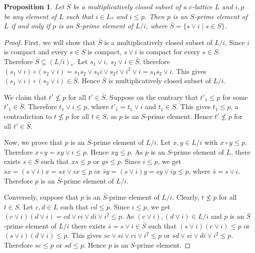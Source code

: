 \documentclass[10pt,twoside,a4paper]{amsart}
\numberwithin{equation}{section}
\theoremstyle{plain}
\newtheorem{prop}[lem]{Proposition}
\theoremstyle{definition}
\begin{document}
		
	\begin{prop}%
	Let $S$ be a multiplicatively closed subset of a $c$-lattice $L$ and $i, p $ be any element of $L$ such that  $i \in L_*$ and $i \leq p$. Then $p$ is an $S$-prime element of $L$ if and only if $p$ is an $\bar{S}$-prime element of $L/i$, where $\bar{S} = \{s \vee i \;|\; s\in S\}$.
	\end{prop}
	\begin{proof}  First, we will show that $\bar{S}$ is a multiplicatively closed subset of $L/i$. Since $i$ is compact and every $s \in S$ is compact, $s \vee i$ is compact for every $s \in S$. Therefore $\bar{S} \subseteq  (L/i)_*$. Let $s_1 \vee i, ~ s_2 \vee i \in \bar{S} $. therefore $(s_1 \vee i) \circ (s_2 \vee i) = s_1 s_2 \vee s_1 i \vee s_2 i \vee i^2 \vee i = s_1 s_2 \vee  i $. This gives $(s_1 \vee i) \circ (s_2 \vee i) \in \bar{S}$. Hence $\bar{S}$ is multiplicatively closed subset of $L/i$. 
			
	We claim that $t' \nleq p$ for all $t' \in \bar{S}$. Suppose on the contrary that $t'_1 \leq p$ for some $t'_1 \in \bar{S}$. Therefore $t_1 \vee i \leq p$, where $t'_1 = t_1 \vee i$ and $t_1 \in S$. This gives $t_1 \leq p$,  a contradiction to  $t \not\leq p$ for all $t \in S$, as $p$ is an $S$-prime element. Hence  $t' \nleq p$ for all $t' \in \bar{S}$.  

	Now, we prove that $p$ is an $\bar{S}$-prime element of $L/i$. Let $x, y \in L/i$ with $x \circ y \leq p$. Therefore    $x \circ y  = xy \vee i \leq p$. Hence $xy \leq p$. As $p$ is an $S$-prime element of $L$, there exists $s \in S$ such that $xs \leq p$ or $ys \leq p$.  Since  $i \leq p$, we get $\bar{s}x=(s \vee i) x = sx \vee ix \leq p$ or   $\bar{s}y=(s \vee i) y = sy \vee iy \leq p$, where $\bar{s}=s\vee i$.  Therefore $p$ is an $\bar{S}$-prime element of $L/i$.
			
	Conversely, suppose that  $p$ is an $\bar{S}$-prime element of $L/i$.  Clearly, $t \nleq p$ for all $t \in S$.  Let $c, d \in L$ such that $ cd \leq p$. Since $i \leq p$, we get $(c \vee i ) (d \vee i) = cd \vee ci \vee di \vee i^2 \leq p$. As $(c \vee i), (d \vee i) \in L/i$ and $p$ is an $\bar{S}$-prime element of $L/i$ there exists $\bar{s}=s \vee i \in \bar{S}$ such that $(s \vee i) (c \vee i) \leq p$ or $(s \vee i) (d \vee i) \leq p$. This gives $sc \vee si \vee ci \vee i^2 \leq p$ or $sd \vee si \vee di \vee i^2 \leq p$.   Therefore $sc \leq p $ or $sd \leq p$. Hence $p$ is an $S$-prime element.
	\end{proof}
		
\end{document}
